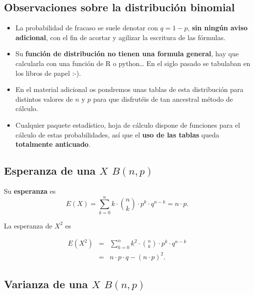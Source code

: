 \documentclass[]{book}
\providecommand{\tightlist}{%
  \setlength{\itemsep}{0pt}\setlength{\parskip}{0pt}}
\begin{document}
\hypertarget{observaciones-sobre-la-distribuciuxf3n-binomial}{%
\subsection{Observaciones sobre la distribución binomial}\label{observaciones-sobre-la-distribuciuxf3n-binomial}}

\begin{itemize}
\tightlist
\item
  La probabilidad de fracaso se suele denotar con \(q=1-p\), \textbf{sin ningún aviso adicional}, con el fin de acortar y agilizar la escritura de las fórmulas.
\item
  Su \textbf{función de distribución no tienen una formula general}, hay que calcularla con una función de R o python\ldots{} En el siglo pasado se tabulaban en los libros de papel :-).
\item
  En el material adicional os pondremos unas tablas de esta distribución
  para distintos valores de \(n\) y \(p\) para que disfrutéis de tan ancestral método de cálculo.
\item
  Cualquier paquete estadístico, hoja de cálculo dispone de
  funciones para el cálculo de estas probabilidades, así que el \textbf{uso de las tablas} queda \textbf{totalmente anticuado}.
\end{itemize}

\hypertarget{esperanza-de-una-x-bnp}{%
\subsection{\texorpdfstring{Esperanza de una \(X\) \(B(n,p)\)}{Esperanza de una X B(n,p)}}\label{esperanza-de-una-x-bnp}}

Su \textbf{esperanza} es
\[E(X)=\displaystyle\sum_{k=0}^n k \cdot  {n \choose k }\cdot p^k\cdot q^{n-k} = n\cdot p.\]

La esperanza de \(X^2\) es

\[
\begin{eqnarray*}
E(X^2)&=& \displaystyle\sum_{k=0}^n k^2 \cdot  {n \choose k }\cdot p^k\cdot q^{n-k}\\
&=& n\cdot p\cdot q-(n\cdot p)^2.
\end{eqnarray*}
\]

\hypertarget{varianza-de-una-x-bnp}{%
\subsection{\texorpdfstring{Varianza de una \(X\) \(B(n,p)\)}{Varianza de una X B(n,p)}}\label{varianza-de-una-x-bnp}}
\end{document}
